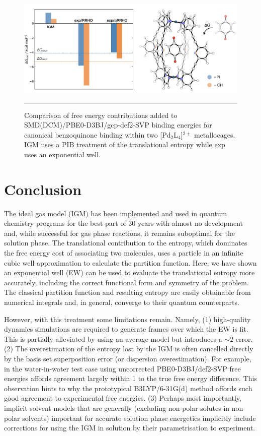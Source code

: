 \documentclass[../main.tex]{subfiles}
\begin{document}
\vspace{0.4cm}
\begin{figure}[h!]
	\centering
	\includegraphics[width=\textwidth]{4/figs/figX12/figX12}
	\vspace{0.2cm}
	\hrule
	\caption{Comparison of free energy contributions added to SMD(DCM)/PBE0-D3BJ/gcp-def2-SVP binding energies for canonical benzoquinone binding within two [Pd$_2$L$_4$]${}^{2+}$ metallocages. IGM uses a PIB treatment of the translational entropy while exp uses an exponential well.} 
	\label{fig::entropy_X12}
\end{figure}


\clearpage
\section{Conclusion}

The ideal gas model (IGM) has been implemented and used in quantum chemistry programs for the best part of 30 years with almost no development and, while successful for gas phase reactions, it remains suboptimal for the solution phase. The translational contribution to the entropy, which dominates the free energy cost of associating two molecules, uses a particle in an infinite cubic well approximation to calculate the partition function. Here, we have shown an exponential well (EW) can be used to evaluate the translational entropy more accurately, including the correct functional form and symmetry of the problem. The classical partition function and resulting entropy are easily obtainable from numerical integrals and, in general, converge to their quantum counterparts. 

However, with this treatment some limitations remain. Namely, (1) high-quality dynamics simulations are required to generate frames over which the EW is fit. This is partially alleviated by using an average model but introduces a $\sim 2$ \kcalx error. (2) The overestimation of the entropy lost by the IGM is often cancelled directly by the basis set superposition error (or dispersion overestimation). For example, in the water-in-water test case using uncorrected PBE0-D3BJ/def2-SVP free energies affords agreement largely within 1 \kcalx to the true free energy difference. This observation hints to why the prototypical B3LYP/6-31G(d) method affords such good agreement to experimental free energies. (3) Perhaps most importantly, implicit solvent models that are generally (excluding non-polar solutes in non-polar solvents) important for accurate solution phase energetics implicitly include corrections for using the IGM in solution by their parametrisation to experiment.
\end{document}
